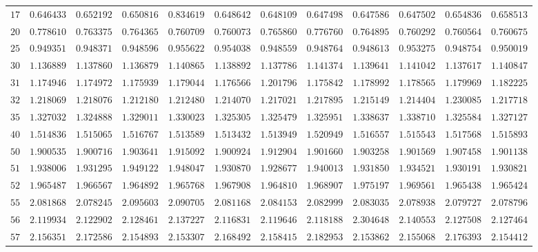 \begin{sidewaystable}
\begin{tabular}{r|rrrrrrrrrrr}
$17$ & $0.646433$ & $0.652192$ & $0.650816$ & $0.834619$ & $0.648642$ & $0.648109$ & $0.647498$ & $0.647586$ & $0.647502$ & $0.654836$ & $0.658513$ \\
$20$ & $0.778610$ & $0.763375$ & $0.764365$ & $0.760709$ & $0.760073$ & $0.765860$ & $0.776760$ & $0.764895$ & $0.760292$ & $0.760564$ & $0.760675$ \\
$25$ & $0.949351$ & $0.948371$ & $0.948596$ & $0.955622$ & $0.954038$ & $0.948559$ & $0.948764$ & $0.948613$ & $0.953275$ & $0.948754$ & $0.950019$ \\
$30$ & $1.136889$ & $1.137860$ & $1.136879$ & $1.140865$ & $1.138892$ & $1.137786$ & $1.141374$ & $1.139641$ & $1.141042$ & $1.137617$ & $1.140847$ \\
$31$ & $1.174946$ & $1.174972$ & $1.175939$ & $1.179044$ & $1.176566$ & $1.201796$ & $1.175842$ & $1.178992$ & $1.178565$ & $1.179969$ & $1.182225$ \\
$32$ & $1.218069$ & $1.218076$ & $1.212180$ & $1.212480$ & $1.214070$ & $1.217021$ & $1.217895$ & $1.215149$ & $1.214404$ & $1.230085$ & $1.217718$ \\
$35$ & $1.327032$ & $1.324888$ & $1.329011$ & $1.330023$ & $1.325305$ & $1.325479$ & $1.325951$ & $1.338637$ & $1.338710$ & $1.325584$ & $1.327127$ \\
$40$ & $1.514836$ & $1.515065$ & $1.516767$ & $1.513589$ & $1.513432$ & $1.513949$ & $1.520949$ & $1.516557$ & $1.515543$ & $1.517568$ & $1.515893$ \\
$50$ & $1.900535$ & $1.900716$ & $1.903641$ & $1.915092$ & $1.900924$ & $1.912904$ & $1.901660$ & $1.903258$ & $1.901569$ & $1.907458$ & $1.901138$ \\
$51$ & $1.938006$ & $1.931295$ & $1.949122$ & $1.948047$ & $1.930870$ & $1.928677$ & $1.940013$ & $1.931850$ & $1.934521$ & $1.930191$ & $1.930821$ \\
$52$ & $1.965487$ & $1.966567$ & $1.964892$ & $1.965768$ & $1.967908$ & $1.964810$ & $1.968907$ & $1.975197$ & $1.969561$ & $1.965438$ & $1.965424$ \\
$55$ & $2.081868$ & $2.078245$ & $2.095603$ & $2.090705$ & $2.081168$ & $2.084153$ & $2.082999$ & $2.083035$ & $2.078938$ & $2.079727$ & $2.078796$ \\
$56$ & $2.119934$ & $2.122902$ & $2.128461$ & $2.137227$ & $2.116831$ & $2.119646$ & $2.118188$ & $2.304648$ & $2.140553$ & $2.127508$ & $2.127464$ \\
$57$ & $2.156351$ & $2.172586$ & $2.154893$ & $2.153307$ & $2.168492$ & $2.158415$ & $2.182953$ & $2.153862$ & $2.155068$ & $2.176393$ & $2.154412$ \\

\end{tabular}
\end{sidewaystable}
